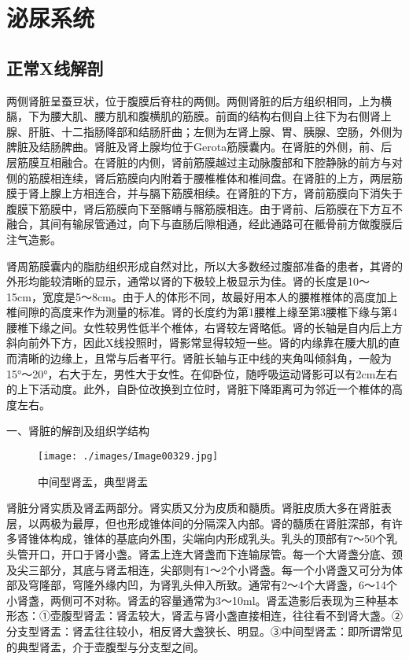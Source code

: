 \chapter{泌尿系统}

\section{正常X线解剖}

两侧肾脏呈蚕豆状，位于腹膜后脊柱的两侧。两侧肾脏的后方组织相同，上为横膈，下为腰大肌、腰方肌和腹横肌的筋膜。前面的结构右侧自上往下为右侧肾上腺、肝脏、十二指肠降部和结肠肝曲；左侧为左肾上腺、胃、胰腺、空肠，外侧为脾脏及结肠脾曲。肾脏及肾上腺均位于Gerota筋膜囊内。在肾脏的外侧，前、后层筋膜互相融合。在肾脏的内侧，肾前筋膜越过主动脉腹部和下腔静脉的前方与对侧的筋膜相连续，肾后筋膜向内附着于腰椎椎体和椎间盘。在肾脏的上方，两层筋膜于肾上腺上方相连合，并与膈下筋膜相续。在肾脏的下方，肾前筋膜向下消失于腹膜下筋膜中，肾后筋膜向下至髂嵴与髂筋膜相连。由于肾前、后筋膜在下方互不融合，其间有输尿管通过，向下与直肠后隙相通，经此通路可在骶骨前方做腹膜后注气造影。

肾周筋膜囊内的脂肪组织形成自然对比，所以大多数经过腹部准备的患者，其肾的外形均能较清晰的显示，通常以肾的下极较上极显示为佳。肾的长度是10～15cm，宽度是5～8cm。由于人的体形不同，故最好用本人的腰椎椎体的高度加上椎间隙的高度来作为测量的标准。肾的长度约为第1腰椎上缘至第3腰椎下缘与第4腰椎下缘之间。女性较男性低半个椎体，右肾较左肾略低。肾的长轴是自内后上方斜向前外下方，因此X线投照时，肾影常显得较短一些。肾的内缘靠在腰大肌的直而清晰的边缘上，且常与后者平行。肾脏长轴与正中线的夹角叫倾斜角，一般为15°～20°，右大于左，男性大于女性。在仰卧位，随呼吸运动肾影可以有2cm左右的上下活动度。此外，自卧位改换到立位时，肾脏下降距离可为邻近一个椎体的高度左右。

一、肾脏的解剖及组织学结构

\begin{figure}[!htbp]
    \centering
    \texttt{[image: ./images/Image00329.jpg]}
    \captionsetup{justification=centering}
    \caption{中间型肾盂，典型肾盂}
    \label{fig6-1-1}
\end{figure}

肾脏分肾实质及肾盂两部分。肾实质又分为皮质和髓质。肾脏皮质大多在肾脏表层，以两极为最厚，但也形成锥体间的分隔深入内部。肾的髓质在肾脏深部，有许多肾锥体构成，锥体的基底向外围，尖端向内形成乳头。乳头的顶部有7～50个乳头管开口，开口于肾小盏。肾盂上连大肾盏而下连输尿管。每一个大肾盏分底、颈及尖三部分，其底与肾盂相连，尖部则有1～2个小肾盏。每一个小肾盏又可分为体部及穹隆部，穹隆外缘内凹，为肾乳头伸入所致。通常有2～4个大肾盏，6～14个小肾盏，两侧可不对称。肾盂的容量通常为3～10ml。肾盂造影后表现为三种基本形态：①壶腹型肾盂：肾盂较大，肾盂与肾小盏直接相连，往往看不到肾大盏。②分支型肾盂：肾盂往往较小，相反肾大盏狭长、明显。③中间型肾盂：即所谓常见的典型肾盂，介于壶腹型与分支型之间。


